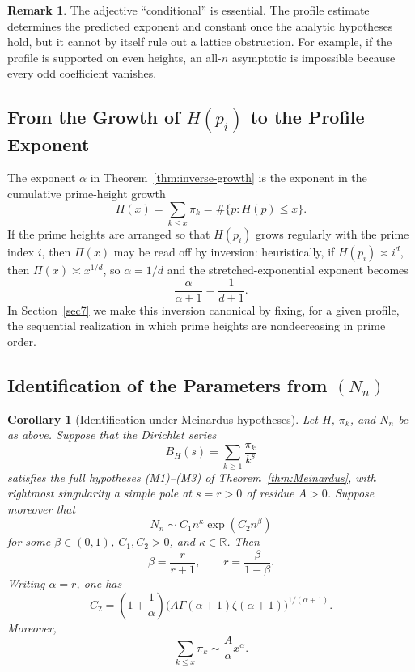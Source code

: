 \documentclass[11pt]{article}
\newtheorem{corollary}{Corollary}
\theoremstyle{definition}
\newtheorem{remark}{Remark}
\begin{document}
\begin{remark}
The adjective ``conditional'' is essential.  The profile estimate determines
the predicted exponent and constant once the analytic hypotheses hold, but it
cannot by itself rule out a lattice obstruction.  For example, if the profile is
supported on even heights, an all-$n$ asymptotic is impossible because every odd
coefficient vanishes.
\end{remark}

\subsection{From the Growth of $H(p_i)$ to the Profile Exponent}

The exponent $\alpha$ in Theorem~\ref{thm:inverse-growth} is the exponent in the
cumulative prime-height growth
\[
  \Pi(x)=\sum_{k\le x}\pi_k=\#\{p:H(p)\le x\}.
\]
If the prime heights are arranged so that $H(p_i)$ grows regularly with the
prime index $i$, then $\Pi(x)$ may be read off by inversion: heuristically, if
$H(p_i)\asymp i^d$, then $\Pi(x)\asymp x^{1/d}$, so $\alpha=1/d$ and the
stretched-exponential exponent becomes
\[
  \frac{\alpha}{\alpha+1}=\frac{1}{d+1}.
\]
In Section~\ref{sec7} we make this inversion canonical by fixing, for a given
profile, the sequential realization in which prime heights are nondecreasing in
prime order.

\subsection{Identification of the Parameters from $(N_n)$}

\begin{corollary}[Identification under Meinardus hypotheses]
\label{thm:inverse-converse}
Let $H$, $\pi_k$, and $N_n$ be as above.  Suppose that the Dirichlet series
\[
  B_H(s)=\sum_{k\ge1}\frac{\pi_k}{k^s}
\]
satisfies the full hypotheses \textup{(M1)}--\textup{(M3)} of
Theorem~\ref{thm:Meinardus}, with rightmost singularity a simple pole at
$s=r>0$ of residue $A>0$.  Suppose moreover that
\[
  N_n\sim C_1n^\kappa\exp(C_2n^\beta)
\]
for some $\beta\in(0,1)$, $C_1,C_2>0$, and $\kappa\in\mathbb R$.  Then
\[
  \beta=\frac{r}{r+1},
  \qquad
  r=\frac{\beta}{1-\beta}.
\]
Writing $\alpha=r$, one has
\[
  C_2=
  \left(1+\frac1\alpha\right)
  \bigl(A\Gamma(\alpha+1)\zeta(\alpha+1)\bigr)^{1/(\alpha+1)}.
\]
Moreover,
\[
  \sum_{k\le x}\pi_k\sim\frac{A}{\alpha}x^\alpha.
\]
\end{corollary}
\end{document}
